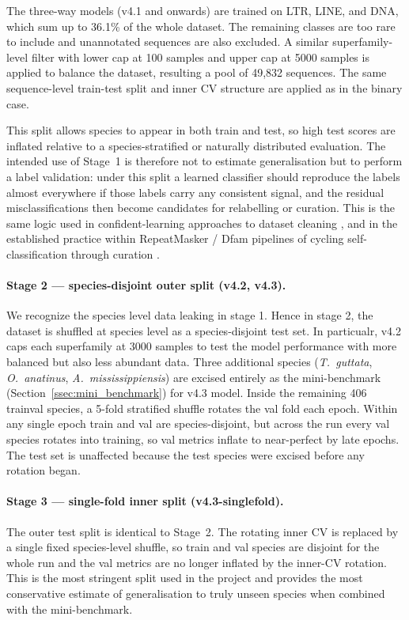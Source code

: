 \documentclass[12pt]{article}
\begin{document}
The three-way models (v4.1 and onwards) are trained on  LTR, LINE, and DNA, which sum up to 36.1\% of the whole dataset. The remaining classes are too rare to include and unannotated sequences are also excluded. A similar superfamily-level filter with lower cap at 100 samples and upper cap at 5000 samples is applied to balance the dataset, resulting a pool of 49{,}832 sequences. The same sequence-level train-test split and inner CV structure are applied as in the binary case. 

This split allows species to appear in both train and test, so high test scores are inflated relative to a species-stratified or naturally distributed evaluation. The intended use of Stage~1 is therefore not to estimate generalisation but to perform a label validation: under this split a learned classifier should reproduce the labels almost everywhere if those labels carry any consistent signal, and the residual misclassifications then become candidates for relabelling or curation. This is the same logic used in confident-learning approaches to dataset cleaning \cite{northcutt2021confident}, and in the established practice within RepeatMasker / Dfam pipelines of cycling self-classification through curation \cite{storer2021dfam,flynn2020repeatmodeler2}.

\paragraph{Stage 2 --- species-disjoint outer split (v4.2, v4.3).} We recognize the species level data leaking in stage 1. Hence in stage 2, the dataset is shuffled at species level as a species-disjoint test set. In particualr, v4.2 caps each superfamily at 3000 samples to test the
model performance with more balanced but also less abundant data. Three additional species (\textit{T.~guttata}, \textit{O.~anatinus}, \textit{A.~mississippiensis}) are excised entirely as the mini-benchmark (Section~\ref{ssec:mini_benchmark}) for v4.3 model. Inside the remaining 406 trainval species, a 5-fold stratified shuffle rotates the val fold each epoch. Within any single epoch train and val are species-disjoint, but across the run every val species rotates into training, so val metrics inflate to near-perfect by late epochs. The test set is unaffected because the test species were excised before any rotation began. 

\paragraph{Stage 3 --- single-fold inner split (v4.3-singlefold).} The outer test split is identical to Stage~2. The rotating inner CV is replaced by a single fixed species-level shuffle, so train and val species are disjoint for the whole run and the val metrics are no longer inflated by the inner-CV rotation. This is the most stringent split used in the project and provides the most conservative estimate of generalisation to truly unseen species when combined with the mini-benchmark.
\end{document}
